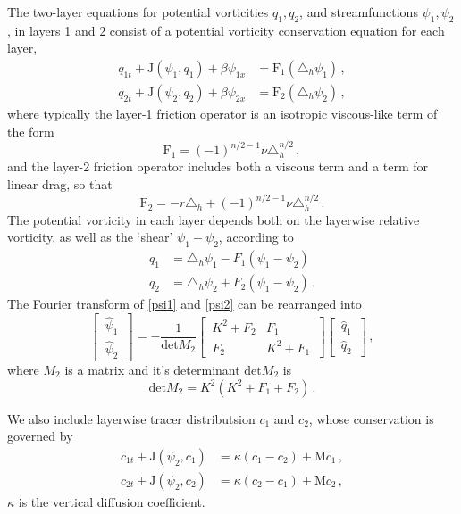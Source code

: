 \documentclass[12pt, oneside]{article}
\newcommand{\com}{\, ,}
\newcommand{\per}{\, .}
\newcommand{\beq}{\begin{equation}}
\newcommand{\eeq}{\end{equation}}
\newcommand{\hlap}{\triangle_h}
\newcommand{\J}{\mathrm{J}}
\newcommand{\friction}{\mathrm{F}}
\newcommand{\mixing}{\mathrm{M}}
\newcommand{\psih}{\hat \psi}
\newcommand{\qh}{\hat q}
\begin{document}
The two-layer equations for potential vorticities $q_1,q_2$, and streamfunctions $\psi_1, \psi_2$, in layers 1 and 2 consist of a potential vorticity conservation equation for each layer, 
\begin{align}
q_{1t} + \J \left ( \psi_1, q_1 \right ) + \beta \psi_{1x} &= \friction_1 \left ( \hlap \psi_1 \right ) \com \\
q_{2t} + \J \left ( \psi_2, q_2 \right ) + \beta \psi_{2x} &= \friction_2 \left ( \hlap \psi_2 \right ) \com
\end{align}
where typically the layer-1 friction operator is an isotropic viscous-like term of the form
\beq
\friction_1 = (-1)^{n/2-1} \nu \hlap^{n/2} \com
\eeq
and the layer-2 friction operator includes both a viscous term and a term for linear drag, so that
\beq
\friction_2 = - r \hlap  + (-1)^{n/2-1} \nu \hlap^{n/2} \per
\eeq
The potential vorticity in each layer depends both on the layerwise relative vorticity, as well as the `shear' $\psi_1-\psi_2$, according to 
\begin{align}
q_1 &= \hlap \psi_1 - F_1 \left ( \psi_1 - \psi_2 \right ) \label{psi1} \\
q_2 &= \hlap \psi_2 + F_2 \left ( \psi_1 - \psi_2 \right ) \per \label{psi2}
\end{align}
The Fourier transform of \eqref{psi1} and \eqref{psi2} can be rearranged into 
\beq
 \left [ \, \begin{matrix}
\psih_1 \\
\psih_2
\end{matrix} \, \right ] = 
- \frac{1}{\text{det} M_2} \left [ \, \begin{matrix}
 K^2 + F_2 &  F_1 \\
F_2 & K^2 + F_1 
\end{matrix} \, \right ]  \left [ \, \begin{matrix}
\qh_1 \\
\qh_2
\end{matrix} \, \right ] \com
\eeq
where $M_2$ is a matrix and it's determinant $\text{det} M_2$ is
\beq
\text{det} M_2 = K^2 \left ( K^2 + F_1 + F_2 \right ) \per
\eeq

We also include layerwise tracer distributsion $c_1$ and $c_2$, whose conservation is governed by
\begin{align}
c_{1t} + \J \left ( \psi_2, c_1 \right ) &= \kappa \left ( c_1 - c_2 \right ) + \mixing c_1 \com \\
c_{2t} + \J \left ( \psi_2, c_2 \right ) &= \kappa \left ( c_2 - c_1 \right ) + \mixing c_2 \com 
\end{align}
$\kappa$ is the vertical diffusion coefficient.
\end{document}
